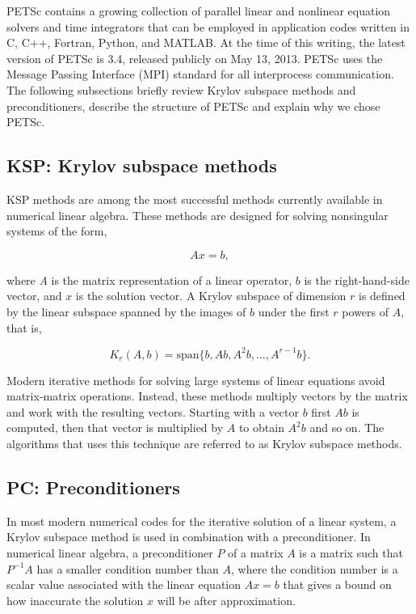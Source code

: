 PETSc contains a growing collection of parallel linear and nonlinear equation solvers and time integrators that can be employed in application codes written in C, C++, Fortran, Python, and MATLAB. At the time of this writing, the latest version of PETSc is 3.4, released publicly on May 13, 2013. PETSc uses the Message Passing Interface (MPI)  \cite{mpi} standard for all interprocess communication. The following subsections briefly review Krylov subspace methods and preconditioners, describe the structure of PETSc and explain why we chose PETSc.

\subsection{KSP: Krylov subspace methods}
KSP methods are among the most successful methods currently available in numerical linear algebra. These methods are designed for solving nonsingular systems of the form,

\begin{equation}
Ax = b,
\end{equation}

\noindent where \textit{A} is the matrix representation of a linear operator, $b$ is the right-hand-side vector, and $x$ is the solution vector. A Krylov subspace of dimension $r$ is defined by the linear subspace spanned by the images of $b$ under the first $r$ powers of $A$, that is,

\begin{equation}
K_r(A,b) = \mbox{span}\{b, Ab, A^2b, . . . , A^{r-1}b\}.
\end{equation}

\noindent  Modern iterative methods for solving large systems of linear equations avoid matrix-matrix operations. Instead, these methods multiply vectors by the matrix and work with the resulting vectors. Starting with a vector $b$ first $Ab$ is computed, then that vector is multiplied by $A$ to obtain $A^{2}b$ and so on. The algorithms that uses this technique are referred to as Krylov subspace methods.

\subsection{PC: Preconditioners}
In most modern numerical codes for the iterative solution of a linear system, a Krylov subspace method is used in combination with a preconditioner. In numerical linear algebra, a preconditioner $P$ of a matrix $A$ is a matrix such that $P^{-1}A$ has a smaller condition number than $A$, where the condition number is a scalar value associated with the linear equation $Ax = b$ that gives a bound on how inaccurate the solution $x$ will be after approximation.

